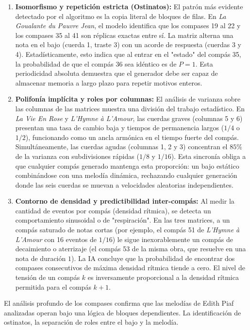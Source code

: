 \documentclass{article}
\theoremstyle{plain}
\theoremstyle{definition}
\begin{document}
\begin{enumerate}
	\item{
	      \textbf{Isomorfismo y repetición estricta (Ostinatos):}
	      El patrón más evidente detectado por el algoritmo es la copia literal de bloques de filas. En \textit{La Goualante du Pauvre Jean}, el modelo identifica que los compases 19 al 22 y los compases 35 al 41 son réplicas exactas entre sí. La matriz alterna una nota en el bajo (cuerda 1, traste 3) con un acorde de respuesta (cuerdas 3 y 4). Estadísticamente, esto indica que al entrar en el "estado" del compás 35, la probabilidad de que el compás 36 sea idéntico es de $P=1$. Esta periodicidad absoluta demuestra que el generador debe ser capaz de almacenar memoria a largo plazo para repetir motivos enteros.
	      }
	\item{
	      \textbf{Polifonía implícita y roles por columnas:}
	      El análisis de varianza sobre las columnas de las matrices muestra una división del trabajo estadístico. En \textit{La Vie En Rose} y \textit{L'Hymne à L'Amour}, las cuerdas graves (columnas 5 y 6) presentan una tasa de cambio baja y tiempos de permanencia largos ($1/4$ o $1/2$), funcionando como un ancla armónica en el tiempo fuerte del compás. Simultáneamente, las cuerdas agudas (columnas 1, 2 y 3) concentran el $85\%$ de la varianza con subdivisiones rápidas ($1/8$ y $1/16$). Esta sincronía obliga a que cualquier compás generado mantenga esta proporción: un bajo estático combinándose con una melodía dinámica, rechazando cualquier generación donde las seis cuerdas se muevan a velocidades aleatorias independientes.
	      }
	\item{
	      \textbf{Contorno de densidad y predictibilidad inter-compás:}
	      Al medir la cantidad de eventos por compás (densidad rítmica), se detecta un comportamiento sinusoidal o de "respiración". En las tres matrices, a un compás saturado de notas cortas (por ejemplo, el compás 51 de \textit{L'Hymne à L'Amour} con 16 eventos de $1/16$) le sigue inexorablemente un compás de decaimiento o aterrizaje (el compás 53 de la misma obra, que resuelve en una nota de duración $1$). La IA concluye que la probabilidad de encontrar dos compases consecutivos de máxima densidad rítmica tiende a cero. El nivel de tensión de un compás $k$ es inversamente proporcional a la densidad rítmica permitida para el compás $k+1$.
	      }
\end{enumerate}

El análisis profundo de los compases confirma que las melodías de Edith Piaf analizadas operan bajo una lógica de bloques dependientes. La identificación de ostinatos, la separación de roles entre el bajo y la melodía.
\end{document}
